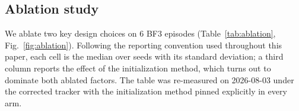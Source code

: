 \subsection{Ablation study}

We ablate two key design choices on 6 BF3 episodes
(Table~\ref{tab:ablation}, Fig.~\ref{fig:ablation}).  Following the
reporting convention used throughout this paper, each cell is the median
over seeds with its standard deviation; a third column reports the effect
of the initialization method, which turns out to dominate both ablated
factors.  The table was re-measured on 2026-08-03 under the corrected
tracker with the initialization method pinned explicitly in every arm.

